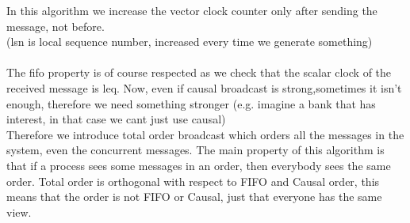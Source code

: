 \documentclass[11pt, a4paper]{article}
\begin{document}
In this algorithm we increase the vector clock counter only after sending the message, not before.\\
(lsn is local sequence number, increased every time we generate something)\\\\
The fifo property is of course respected as we check that the scalar clock of the received message is leq.
Now, even if causal broadcast is strong,sometimes it isn't enough, therefore we need something stronger (e.g. imagine a bank that has interest, in that case we cant just use causal)\\
Therefore we introduce total order broadcast which orders all the messages in the system, even the concurrent messages. The main property of this algorithm is that if a process sees some messages in an order, then everybody sees the same order.
Total order is orthogonal with respect to FIFO and Causal order, this means that the order is not FIFO or Causal, just that everyone has the same view.
\end{document}
